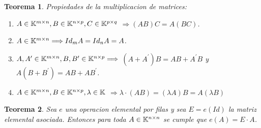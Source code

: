 \documentclass[]{article}
\newtheorem{theorem}{Teorema}
\begin{document}
\begin{theorem}
    Propiedades de la multiplicacion de matrices:
    \begin{enumerate}
        \item $A \in \text{$\mathbb{K}^{m \times n}$}, B \in \mathbb{K}^{n\times p},C \in \mathbb{K}^{p\times q}$
        $\Longrightarrow (AB)C=A(BC)$.
        \item $A \in \text{$\mathbb{K}^{m \times n}$} \Longrightarrow Id_mA = Id_nA = A$.
        \item $A,A^\prime \in \text{$\mathbb{K}^{m \times n}$}, B,B^\prime \in \mathbb{K}^{n\times p} \Longrightarrow$
        $(A+A^\prime)B = AB+A^\prime B$ y $A(B+B^\prime) = AB+AB^\prime$.
        \item $A \in \text{$\mathbb{K}^{m \times n}$}, B \in \mathbb{K}^{n\times p},\lambda \in \mathbb{K}$
        $\Longrightarrow \lambda \cdot (AB) = (\lambda A)B= A(\lambda B)$ 
    \end{enumerate}
\end{theorem}
\newpage
\begin{theorem}
    Sea $e$ una operacion elemental por filas y sea $E=e(Id)$ la matriz elemental asociada.
    Entonces para toda $A \in \text{$\mathbb{K}^{n \times n}$}$ se cumple que $e(A)=E \cdot A$. 
\end{theorem}
\end{document}

